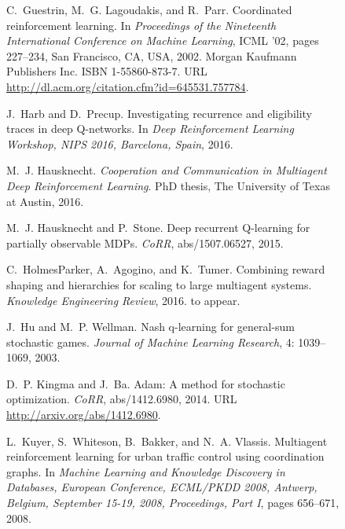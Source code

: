 \documentclass{article}
\begin{document}
\begin{SCfigure}
\begin{thebibliography}{40}
C.~Guestrin, M.~G. Lagoudakis, and R.~Parr.
\newblock Coordinated reinforcement learning.
\newblock In \emph{Proceedings of the Nineteenth International Conference on
  Machine Learning}, ICML '02, pages 227--234, San Francisco, CA, USA, 2002.
  Morgan Kaufmann Publishers Inc.
\newblock ISBN 1-55860-873-7.
\newblock URL \url{http://dl.acm.org/citation.cfm?id=645531.757784}.

J.~Harb and D.~Precup.
\newblock Investigating recurrence and eligibility traces in deep {Q-}networks.
\newblock In \emph{Deep Reinforcement Learning Workshop, NIPS 2016, Barcelona,
  Spain}, 2016.

M.~J. Hausknecht.
\newblock \emph{Cooperation and Communication in Multiagent Deep Reinforcement
  Learning}.
\newblock PhD thesis, The University of Texas at Austin, 2016.

M.~J. Hausknecht and P.~Stone.
\newblock Deep recurrent {Q}-learning for partially observable {MDPs}.
\newblock \emph{CoRR}, abs/1507.06527, 2015.

C.~HolmesParker, A.~Agogino, and K.~Tumer.
\newblock Combining reward shaping and hierarchies for scaling to large
  multiagent systems.
\newblock \emph{Knowledge Engineering Review}, 2016.
\newblock to appear.

J.~Hu and M.~P. Wellman.
\newblock Nash q-learning for general-sum stochastic games.
\newblock \emph{Journal of Machine Learning Research}, 4: 1039--1069,
  2003.

D.~P. Kingma and J.~Ba.
\newblock Adam: {A} method for stochastic optimization.
\newblock \emph{CoRR}, abs/1412.6980, 2014.
\newblock URL \url{http://arxiv.org/abs/1412.6980}.

L.~Kuyer, S.~Whiteson, B.~Bakker, and N.~A. Vlassis.
\newblock Multiagent reinforcement learning for urban traffic control using
  coordination graphs.
\newblock In \emph{Machine Learning and Knowledge Discovery in Databases,
  European Conference, {ECML/PKDD} 2008, Antwerp, Belgium, September 15-19,
  2008, Proceedings, Part {I}}, pages 656--671, 2008.


\end{thebibliography}
\end{SCfigure}
\end{document}
